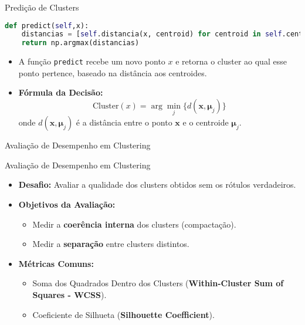 \documentclass{beamer}
\begin{document}
\begin{frame}[fragile]{Predição de Clusters}
\begin{lstlisting}[language=Python]
def predict(self,x):
    distancias = [self.distancia(x, centroid) for centroid in self.centroids]
    return np.argmax(distancias)
\end{lstlisting}
    \vspace{0.3cm}
    \begin{itemize}
        \item A função \texttt{predict} recebe um novo ponto \( x \) e retorna o cluster ao qual esse ponto pertence, baseado na distância aos centroides.
    \end{itemize}
    \vspace{0.3cm}
    \begin{itemize}
        \item \textbf{Fórmula da Decisão:}
        \[
        \text{Cluster}(x) = \arg\min_{j} \{d(\mathbf{x}, \mathbf{\mu}_j)\}
        \]
        onde \( d(\mathbf{x}, \mathbf{\mu}_j) \) é a distância entre o ponto \( \mathbf{x} \) e o centroide \( \mathbf{\mu}_j \).
    \end{itemize}
\end{frame}




\begin{frame}
    \centering
    \huge
    Avaliação de Desempenho em Clustering
\end{frame}


\begin{frame}{Avaliação de Desempenho em Clustering}
    \begin{itemize}
        \item \textbf{Desafio:} Avaliar a qualidade dos clusters obtidos sem os rótulos verdadeiros.
        \item \textbf{Objetivos da Avaliação:}
        \begin{itemize}
            \item Medir a \textbf{coerência interna} dos clusters (compactação).
            \item Medir a \textbf{separação} entre clusters distintos.
        \end{itemize}
        \item \textbf{Métricas Comuns:}
        \begin{itemize}
            \item Soma dos Quadrados Dentro dos Clusters (\textbf{Within-Cluster Sum of Squares - WCSS}).
            \item Coeficiente de Silhueta (\textbf{Silhouette Coefficient}).
        \end{itemize}
    \end{itemize}
\end{frame}
\end{document}
